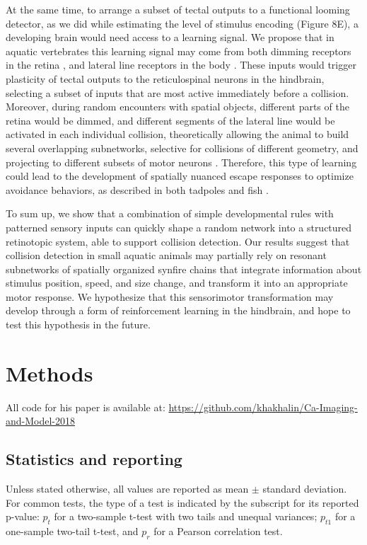\documentclass{article}
\begin{document}
At the same time, to arrange a subset of tectal outputs to a functional looming detector, as we did while estimating the level of stimulus encoding (Figure 8E), a developing brain would need access to a learning signal. We propose that in aquatic vertebrates this learning signal may come from both dimming receptors in the retina \citep{baranauskas2012}, and lateral line receptors in the body \citep{truszkowski2017}. These inputs would trigger plasticity of tectal outputs to the reticulospinal neurons in the hindbrain, selecting a subset of inputs that are most active immediately before a collision. Moreover, during random encounters with spatial objects, different parts of the retina would be dimmed, and different segments of the lateral line would be activated in each individual collision, theoretically allowing the animal to build several overlapping subnetworks, selective for collisions of different geometry, and projecting to different subsets of motor neurons \citep{helmbrecht2018topography}. Therefore, this type of learning could lead to the development of spatially nuanced escape responses to optimize avoidance behaviors, as described in both tadpoles \citep{khakhalin2014} and fish \citep{bhattacharyya2017assessment}.

To sum up, we show that a combination of simple developmental rules with patterned sensory inputs can quickly shape a random network into a structured retinotopic system, able to support collision detection. Our results suggest that collision detection in small aquatic animals may partially rely on resonant subnetworks of spatially organized synfire chains that integrate information about stimulus position, speed, and size change, and transform it into an appropriate motor response. We hypothesize that this sensorimotor transformation may develop through a form of reinforcement learning in the hindbrain, and hope to test this hypothesis in the future.

\section*{Methods}

All code for his paper is available at: \url{https://github.com/khakhalin/Ca-Imaging-and-Model-2018}

\subsection*{Statistics and reporting}

Unless stated otherwise, all values are reported as mean $\pm$ standard deviation. For common tests, the type of a test is indicated by the subscript for its reported p-value: $p_t$ for a two-sample t-test with two tails and unequal variances; $p_{t1}$ for a one-sample two-tail t-test, and $p_r$ for a Pearson correlation test.
\end{document}
